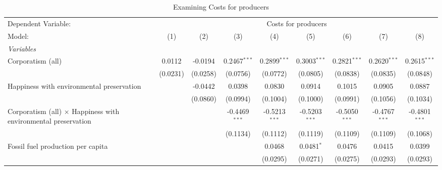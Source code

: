 
\begin{table}[htbp]
   \caption{Examining Costs for producers}
   \centering
   \begin{tabular}{lcccccccc}
      \tabularnewline \midrule \midrule
      Dependent Variable: & \multicolumn{8}{c}{Costs for producers}\\
      Model:                                                                & (1)      & (2)      & (3)             & (4)             & (5)             & (6)             & (7)             & (8)\\  
      \midrule
      \emph{Variables}\\
      Corporatism (all)                                                     & 0.0112   & -0.0194  & 0.2467$^{***}$  & 0.2899$^{***}$  & 0.3003$^{***}$  & 0.2821$^{***}$  & 0.2620$^{***}$  & 0.2615$^{***}$\\   
                                                                            & (0.0231) & (0.0258) & (0.0756)        & (0.0772)        & (0.0805)        & (0.0838)        & (0.0835)        & (0.0848)\\   
      Happiness with environmental preservation                             &          & -0.0442  & 0.0398          & 0.0830          & 0.0914          & 0.1015          & 0.0905          & 0.0887\\   
                                                                            &          & (0.0860) & (0.0994)        & (0.1004)        & (0.1000)        & (0.0991)        & (0.1056)        & (0.1034)\\   
      Corporatism (all) $\times$ Happiness with environmental preservation  &          &          & -0.4469$^{***}$ & -0.5213$^{***}$ & -0.5203$^{***}$ & -0.5050$^{***}$ & -0.4767$^{***}$ & -0.4801$^{***}$\\   
                                                                            &          &          & (0.1134)        & (0.1112)        & (0.1119)        & (0.1109)        & (0.1109)        & (0.1068)\\   
      Fossil fuel production per capita                                     &          &          &                 & 0.0468          & 0.0481$^{*}$    & 0.0476          & 0.0415          & 0.0399\\   
                                                                            &          &          &                 & (0.0295)        & (0.0271)        & (0.0275)        & (0.0293)        & (0.0293)\\   

\end{tabular}
\end{table}
